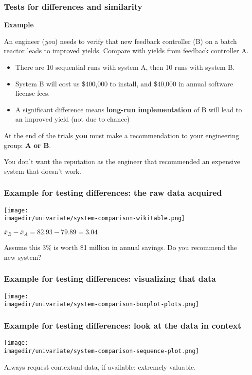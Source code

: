 \begin{frame}\frametitle{Tests for differences and similarity}

	\textbf{Example}

	An engineer (\emph{you}) needs to verify that new feedback controller (B) on a batch reactor leads to improved yields. Compare with yields from feedback controller A.
	\begin{itemize}
		\item	There are 10 sequential runs with system A, then 10 runs with system B.
		\item	System B will cost us \$400,000 to install, and \$40,000 in annual software license fees.
		\item	A significant difference means \textbf{long-run implementation} of B will lead to an improved yield (not due to chance)
	\end{itemize}

	At the end of the trials \textbf{you} must make a recommendation to your engineering group: \textbf{A or B}. 
	
	\vspace{12pt}
	You don't want the reputation as the engineer that recommended an expensive system that doesn't work.
\end{frame}

\begin{frame}\frametitle{Example for testing differences: the raw data acquired}
	\texttt{[image: \\imagedir/univariate/system-comparison-wikitable.png]}

	\vspace{12pt}
	$\bar{x}_B - \bar{x}_A = 82.93 - 79.89 = 3.04$
	
	\vspace{12pt}
	Assume this 3\% is worth \$1 million in annual savings. Do you recommend the new system?
	
\end{frame}

\begin{frame}\frametitle{Example for testing differences: visualizing that data}
	\texttt{[image: \\imagedir/univariate/system-comparison-boxplot-plots.png]}
\end{frame}

\begin{frame}\frametitle{Example for testing differences: look at the data in context}
	\texttt{[image: \\imagedir/univariate/system-comparison-sequence-plot.png]}

	\vspace{0pt}
	Always request contextual data, if available: extremely valuable. {\color{myOrange}{Let's see why.}}
\end{frame}

